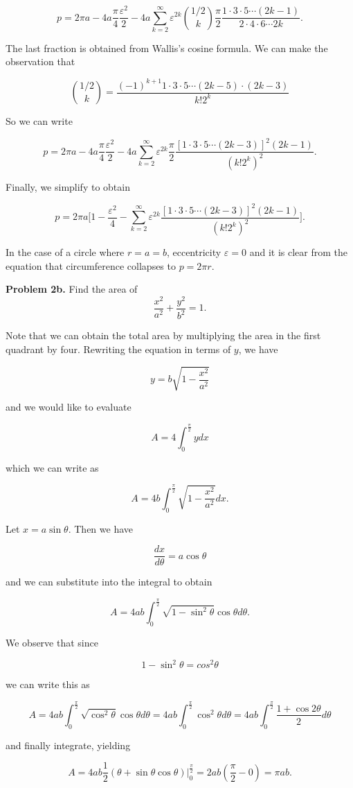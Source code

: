 \documentclass[12pt]{amsart}
\theoremstyle{case}
\begin{document}
	$$ p = 2\pi a - 4a \frac{\pi}{4} \frac{\varepsilon^2}{2} - 4a \sum_{k=2}^{\infty} \varepsilon^{2k} \binom{1/2}{k} \frac{\pi}{2} \frac{1\cdot3\cdot5\cdots(2k-1)}{2\cdot4\cdot6\cdots2k} . $$
	
	The last fraction is obtained from Wallis's cosine formula. We can make the observation that
	
	$$ \binom{1/2}{k} = \frac{(-1)^{k+1} 1 \cdot 3 \cdot 5 \cdots (2k-5) \cdot (2k-3)}{k! 2^k} $$
	
	So we can write
	
	
	
	$$ p = 2\pi a - 4a \frac{\pi}{4} \frac{\varepsilon^2}{2} - 4a \sum_{k=2}^{\infty} \varepsilon^{2k} \frac{\pi}{2} \frac{[1\cdot3\cdot5\cdots(2k-3)]^2 (2k-1)}{(k!2^k)^2} .	$$
	
	Finally, we simplify to obtain
	
	$$ p = 2\pi a \bigg[ 1 - \frac{\varepsilon^2}{4} - \sum_{k=2}^{\infty} \varepsilon^{2k} \frac{[1\cdot3\cdot5\cdots(2k-3)]^2 (2k-1)}{(k!2^k)^2}\bigg] . $$
	
	In the case of a circle where $r = a = b$, eccentricity $\varepsilon = 0$ and it is clear from the equation that circumference collapses to $p = 2\pi r$.
	
	
	\noindent \textbf{Problem 2b.} Find the area of 
	$$ \frac{x^2}{a^2} + \frac{y^2}{b^2} = 1 . $$
	
	Note that we can obtain the total area by multiplying the area in the first quadrant by four. 
	Rewriting the equation in terms of $y$, we have
	
	$$ y = b \sqrt{1 - \frac{x^2}{a^2}} $$
	
	and we would like to evaluate
	
	$$ A = 4\int_{0}^{\frac{\pi}{2}} y dx $$
	
	which we can write as
	
	$$ A = 4b \int_{0}^{\frac{\pi}{2}} \sqrt{1 - \frac{x^2}{a^2}} dx . $$
	
	Let $x = a\sin\theta$. Then we have
	
	$$ \frac{dx}{d\theta} = a\cos\theta $$
	
	and we can substitute into the integral to obtain
	
	$$ A = 4ab \int_{0}^{\frac{\pi}{2}} \sqrt{1 - \sin^2\theta} \cos\theta d\theta . $$
	
	We observe that since 
	
	$$1 - \sin^2\theta = cos^2\theta$$
	
	we can write this as
	
	$$ A = 4ab \int_{0}^{\frac{\pi}{2}} \sqrt{\cos^2\theta} \cos\theta d\theta = 4ab \int_{0}^{\frac{\pi}{2}} \cos^2\theta d\theta = 4ab \int_{0}^{\frac{\pi}{2}} \frac{1+\cos2\theta}{2} d\theta $$
	
	and finally integrate, yielding
	
	$$ A = 4ab \frac{1}{2}(\theta+\sin\theta\cos\theta) \biggr\rvert_{0}^{\frac{\pi}{2}} = 2ab(\frac{\pi}{2} - 0) = \pi ab . $$
	
	
\end{document}
